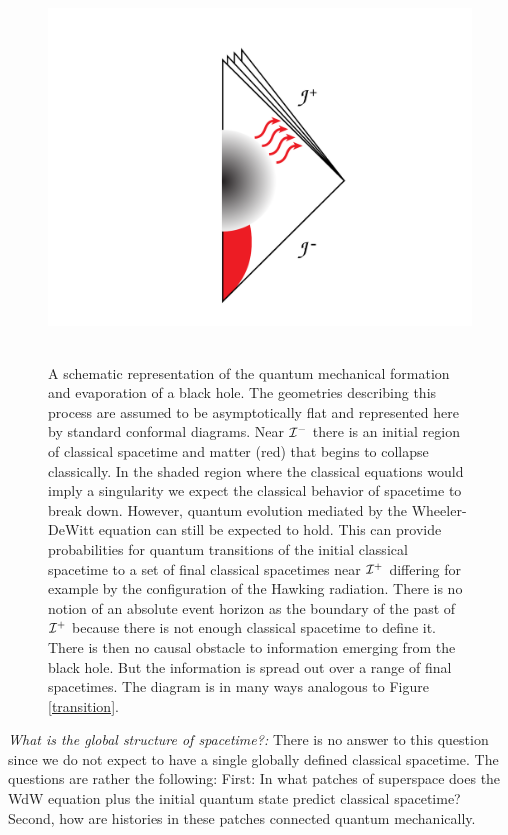 \documentclass[prd,floats,superscriptaddress,eqsecnum,floatfix,nofootinbib,12pt]{revtex4}
\def\scrip{{\cal I}^+}
\def\scrim{{\cal I}^-}
\def\scrim{{\cal I}^-}
\def\jf{}
\def\j2{}
\begin{document}
{{{{%
\begin{figure}[t]
\includegraphics[height=4in]{bh-oneintomany.pdf} 
\caption{A schematic representation of {\jf the quantum mechanical} formation and evaporation of a black hole. The geometries describing this process are assumed to be asymptotically flat and represented here by standard conformal diagrams. Near $\scrim$ there is an initial region of classical spacetime and  matter (red) that begins to collapse classically.  In the shaded region where the classical equations would imply a singularity we expect the classical behavior of spacetime to break down. However, quantum evolution mediated by the Wheeler-DeWitt equation can still be expected to hold.  This can provide probabilities for quantum transitions of the initial classical spacetime to {\jf a set of} final classical spacetimes near $\scrip$ differing for example by the configuration of the Hawking radiation. There is no notion of an absolute event horizon as the boundary of the past of $\cal I^+$ because there is not enough classical spacetime to define it. There is then no causal obstacle to information emerging from the black hole. {\jf But the information is spread out over a range of final spacetimes.} The diagram is in many ways analogous to Figure  \ref{transition}.}
\label{bhclass-sptime}
\end{figure}


{\it What is the global structure of spacetime?:}   {\j2 There is no answer to this question since we do not expect to have a single globally defined classical spacetime. The questions are rather the following:  First: In what patches of superspace does the WdW equation plus the initial quantum state predict classical spacetime?  Second, how are histories in these patches connected quantum mechanically.  } 

}}}}
\end{document}
